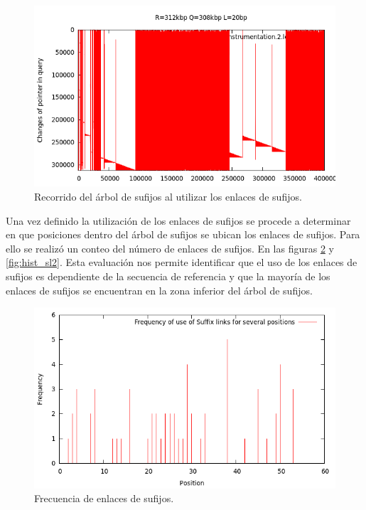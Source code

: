 \documentclass[11pt,a4paper,english]{article}
\begin{document}
\begin{figure}[h]
\begin{center}
\includegraphics[scale=0.4]{r312kbp-q308kbp-l20.png}
\caption{Recorrido del árbol de sufijos al utilizar los enlaces de sufijos.}
\label{fig:st_sl2}
\end{center}
\end{figure} 
Una vez definido la utilización de los enlaces de sufijos se procede a determinar en que posiciones dentro del árbol de sufijos
se ubican los enlaces de sufijos. Para ello se realizó un conteo del número de enlaces de sufijos. En las figuras \ref{fig:hist_sl}
y \ref{fig:hist_sl2}. Esta evaluación nos permite identificar que el uso de los enlaces de sufijos es dependiente de la secuencia
de referencia y que la mayoría de los enlaces de sufijos se encuentran en la zona inferior del árbol de sufijos.
\begin{figure}[h]
\begin{center}
\includegraphics[scale=0.4]{histogram2.png}
\caption{Frecuencia de enlaces de sufijos.}
\label{fig:hist_sl}
\end{center}
\end{figure}
\end{document}
